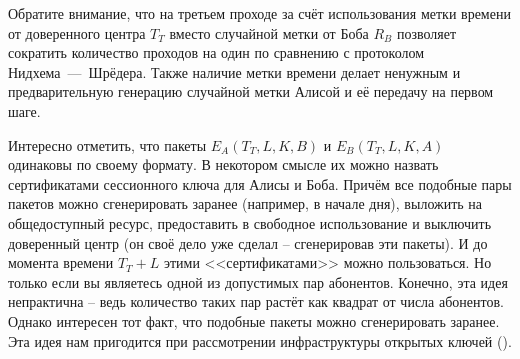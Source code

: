 Обратите внимание, что на третьем проходе за счёт использования метки времени от доверенного центра $T_T$ вместо случайной метки от Боба $R_B$ позволяет сократить количество проходов на один по сравнению с протоколом Нидхема~---~Шрёдера. Также наличие метки времени делает ненужным и предварительную генерацию случайной метки Алисой и её передачу на первом шаге.

Интересно отметить, что пакеты $E_A \left( T_T, L, K, B \right)$ и $E_B \left( T_T, L, K, A \right)$ одинаковы по своему формату. В некотором смысле их можно назвать сертификатами сессионного ключа для Алисы и Боба. Причём все подобные пары пакетов можно сгенерировать заранее (например, в начале дня), выложить на общедоступный ресурс, предоставить в свободное использование и выключить доверенный центр (он своё дело уже сделал -- сгенерировав эти пакеты). И до момента времени $T_T + L$ этими <<сертификатами>> можно пользоваться. Но только если вы являетесь одной из допустимых пар абонентов. Конечно, эта идея непрактична -- ведь количество таких пар растёт как квадрат от числа абонентов. Однако интересен тот факт, что подобные пакеты можно сгенерировать заранее. Эта идея нам пригодится при рассмотрении инфраструктуры открытых ключей ().

